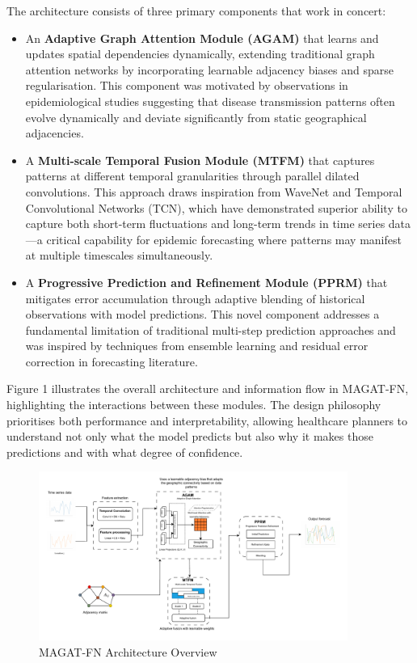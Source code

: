 \documentclass[lettersize, journal]{IEEEtran}
\begin{document}
The architecture consists of three primary components that work in concert:

\begin{itemize}
    \item An \textbf{Adaptive Graph Attention Module (AGAM)} that learns and updates spatial dependencies dynamically, extending traditional graph attention networks by incorporating learnable adjacency biases and sparse regularisation. This component was motivated by observations in epidemiological studies suggesting that disease transmission patterns often evolve dynamically and deviate significantly from static geographical adjacencies.
    
    \item A \textbf{Multi-scale Temporal Fusion Module (MTFM)} that captures patterns at different temporal granularities through parallel dilated convolutions. This approach draws inspiration from WaveNet and Temporal Convolutional Networks (TCN), which have demonstrated superior ability to capture both short-term fluctuations and long-term trends in time series data—a critical capability for epidemic forecasting where patterns may manifest at multiple timescales simultaneously.
    
    \item A \textbf{Progressive Prediction and Refinement Module (PPRM)} that mitigates error accumulation through adaptive blending of historical observations with model predictions. This novel component addresses a fundamental limitation of traditional multi-step prediction approaches and was inspired by techniques from ensemble learning and residual error correction in forecasting literature.
\end{itemize}

Figure 1 illustrates the overall architecture and information flow in MAGAT-FN, highlighting the interactions between these modules. The design philosophy prioritises both performance and interpretability, allowing healthcare planners to understand not only what the model predicts but also why it makes those predictions and with what degree of confidence.


\begin{figure}[ht]
\centering
\includegraphics[width=0.9\textwidth]{../figures/GNN-architecture.pdf}
\caption{MAGAT-FN Architecture Overview}
\label{fig:architecture}
\end{figure}
\end{document}
